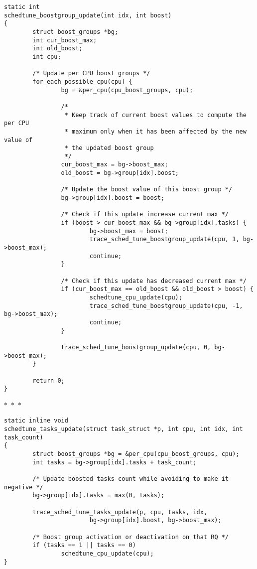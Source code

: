 \documentclass{article}
\newcommand{\divider}{{\begin{center}
  $\ast$~$\ast$~$\ast$
\end{center}}}
\begin{document}
\begin{verbatim}
static int
schedtune_boostgroup_update(int idx, int boost)
{
        struct boost_groups *bg;
        int cur_boost_max;
        int old_boost;
        int cpu;

        /* Update per CPU boost groups */
        for_each_possible_cpu(cpu) {
                bg = &per_cpu(cpu_boost_groups, cpu);

                /*
                 * Keep track of current boost values to compute the per CPU
                 * maximum only when it has been affected by the new value of
                 * the updated boost group
                 */
                cur_boost_max = bg->boost_max;
                old_boost = bg->group[idx].boost;

                /* Update the boost value of this boost group */
                bg->group[idx].boost = boost;

                /* Check if this update increase current max */
                if (boost > cur_boost_max && bg->group[idx].tasks) {
                        bg->boost_max = boost;
                        trace_sched_tune_boostgroup_update(cpu, 1, bg->boost_max);
                        continue;
                }

                /* Check if this update has decreased current max */
                if (cur_boost_max == old_boost && old_boost > boost) {
                        schedtune_cpu_update(cpu);
                        trace_sched_tune_boostgroup_update(cpu, -1, bg->boost_max);
                        continue;
                }

                trace_sched_tune_boostgroup_update(cpu, 0, bg->boost_max);
        }

        return 0;
}
\end{verbatim}
\divider
\begin{verbatim}
static inline void
schedtune_tasks_update(struct task_struct *p, int cpu, int idx, int task_count)
{
        struct boost_groups *bg = &per_cpu(cpu_boost_groups, cpu);
        int tasks = bg->group[idx].tasks + task_count;

        /* Update boosted tasks count while avoiding to make it negative */
        bg->group[idx].tasks = max(0, tasks);

        trace_sched_tune_tasks_update(p, cpu, tasks, idx,
                        bg->group[idx].boost, bg->boost_max);

        /* Boost group activation or deactivation on that RQ */
        if (tasks == 1 || tasks == 0)
                schedtune_cpu_update(cpu);
}
\end{verbatim}
\end{document}
